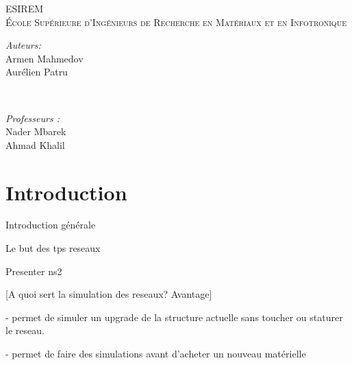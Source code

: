 \documentclass[11pt]{article}
\begin{document}
\begin{titlepage}
	\begin{center}
        \textsc{\large
        	ESIREM \\
			École Supérieure d'Ingénieurs de Recherche en Matériaux et en Infotronique\\       	
			[1.5cm]
		}
	\end{center}

	\begin{minipage}{0.5\textwidth}
		\begin{flushleft} \large
			\emph{Auteurs:}\\
			Armen Mahmedov \\
			Aurélien Patru
		\end{flushleft}
	\end{minipage}
	~
	\begin{minipage}{0.5\textwidth}
		\begin{flushright}\large
			\emph{Professeurs :} \\
			Nader Mbarek \\
			Ahmad Khalil
		\end{flushright}
	\end{minipage}
        
\end{titlepage}
  
\newpage
\strut
\newpage

\tableofcontents

\pagebreak

\listoffigures

\pagebreak


\section*{Introduction}
Introduction générale 

Le but des tps reseaux

Presenter ns2

[A quoi sert la simulation des reseaux? Avantage]

- permet de simuler un upgrade de la structure actuelle sans toucher ou staturer le reseau.   

- permet de faire des simulations avant d'acheter un nouveau matérielle 


\pagebreak


\end{document}
